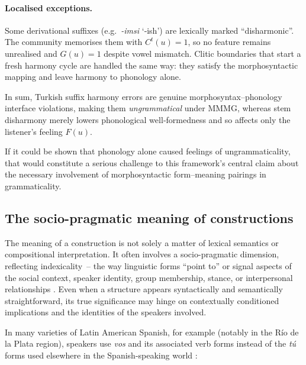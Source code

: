 \documentclass[12pt,letterpaper]{article}
\begin{document}
\paragraph{Localised exceptions.}
Some derivational suffixes (e.g.~\textit{-imsi} `‑ish') are lexically
marked ``disharmonic''.  The community memorises them with $C^t(u)=1$, so no
feature remains unrealised and $G(u)=1$ despite vowel mismatch.  Clitic
boundaries that start a fresh harmony cycle \autocite{KabakVogel2001} are
handled the same way: they satisfy the morphosyntactic mapping and leave
harmony to phonology alone.

In sum, Turkish suffix harmony errors are genuine morphosyntax--phonology
interface violations, making them \emph{ungrammatical} under MMMG, whereas
stem disharmony merely lowers phonological well‑formedness and so affects only
the listener's feeling $F(u)$.



If it could be shown that phonology alone caused feelings of ungrammaticality, that would constitute a serious challenge to this framework's central claim about the necessary involvement of morphosyntactic form--meaning pairings in grammaticality.


\subsection{The socio-pragmatic meaning of constructions}\label{sec:point3-social}

The meaning of a construction is not solely a matter of lexical semantics or compositional interpretation. It often involves a socio-pragmatic dimension, reflecting indexicality~-- the way linguistic forms ``point to'' or signal aspects of the social context, speaker identity, group membership, stance, or interpersonal relationships \autocite{Eckert2012, Silverstein1976}. Even when a structure appears syntactically and semantically straightforward, its true significance may hinge on contextually conditioned implications and the identities of the speakers involved.

In many varieties of Latin American Spanish, for example (notably in the Río de la Plata region), speakers use \textit{vos} and its associated verb forms instead of the \textit{tú} forms used elsewhere in the Spanish-speaking world \autocite{bertolotti2016}:

\z
\end{document}
